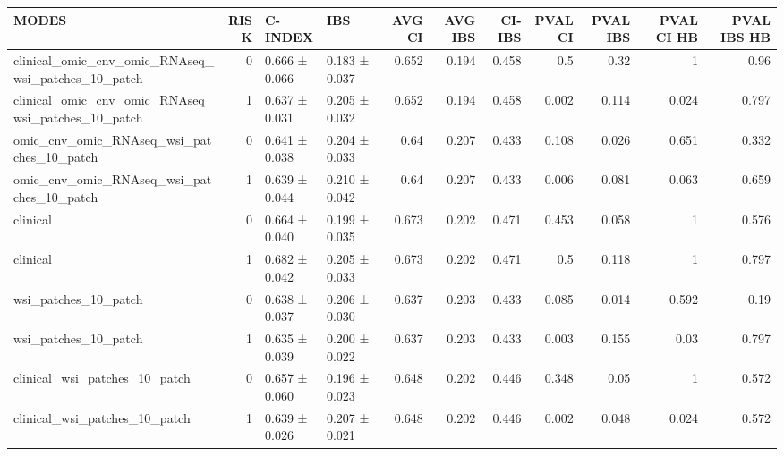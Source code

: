 \begin{tabular}{lrllrrrrrrr}
\hline
 MODES                                              &   RISK & C-INDEX       & IBS           &   AVG CI &   AVG IBS &   CI- IBS &   PVAL CI &   PVAL IBS &   PVAL CI HB &   PVAL IBS HB \\
\hline
 clinical\_omic\_cnv\_omic\_RNAseq\_wsi\_patches\_10\_patch &      0 & 0.666 ± 0.066 & 0.183 ± 0.037 &    0.652 &     0.194 &     0.458 &     0.5   &      0.32  &        1     &         0.96  \\
 clinical\_omic\_cnv\_omic\_RNAseq\_wsi\_patches\_10\_patch &      1 & 0.637 ± 0.031 & 0.205 ± 0.032 &    0.652 &     0.194 &     0.458 &     0.002 &      0.114 &        0.024 &         0.797 \\
 omic\_cnv\_omic\_RNAseq\_wsi\_patches\_10\_patch          &      0 & 0.641 ± 0.038 & 0.204 ± 0.033 &    0.64  &     0.207 &     0.433 &     0.108 &      0.026 &        0.651 &         0.332 \\
 omic\_cnv\_omic\_RNAseq\_wsi\_patches\_10\_patch          &      1 & 0.639 ± 0.044 & 0.210 ± 0.042 &    0.64  &     0.207 &     0.433 &     0.006 &      0.081 &        0.063 &         0.659 \\
 clinical                                           &      0 & 0.664 ± 0.040 & 0.199 ± 0.035 &    0.673 &     0.202 &     0.471 &     0.453 &      0.058 &        1     &         0.576 \\
 clinical                                           &      1 & 0.682 ± 0.042 & 0.205 ± 0.033 &    0.673 &     0.202 &     0.471 &     0.5   &      0.118 &        1     &         0.797 \\
 wsi\_patches\_10\_patch                               &      0 & 0.638 ± 0.037 & 0.206 ± 0.030 &    0.637 &     0.203 &     0.433 &     0.085 &      0.014 &        0.592 &         0.19  \\
 wsi\_patches\_10\_patch                               &      1 & 0.635 ± 0.039 & 0.200 ± 0.022 &    0.637 &     0.203 &     0.433 &     0.003 &      0.155 &        0.03  &         0.797 \\
 clinical\_wsi\_patches\_10\_patch                      &      0 & 0.657 ± 0.060 & 0.196 ± 0.023 &    0.648 &     0.202 &     0.446 &     0.348 &      0.05  &        1     &         0.572 \\
 clinical\_wsi\_patches\_10\_patch                      &      1 & 0.639 ± 0.026 & 0.207 ± 0.021 &    0.648 &     0.202 &     0.446 &     0.002 &      0.048 &        0.024 &         0.572 \\

\end{tabular}
